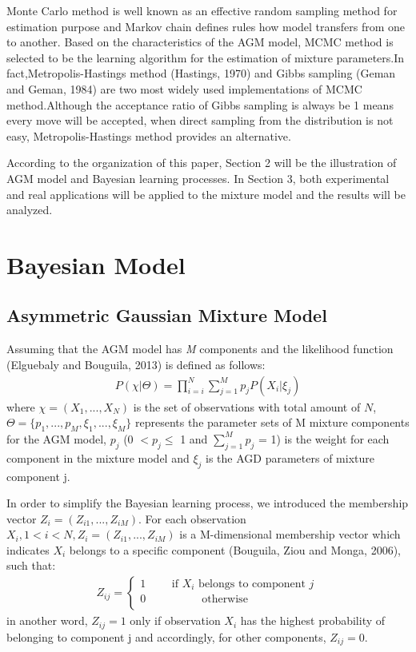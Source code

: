 \documentclass[conference]{llncs}
\begin{document}
Monte Carlo method is well known as an effective random sampling method for estimation purpose and Markov chain defines rules how model transfers from one to another. Based on the characteristics of the AGM model, MCMC method is selected to be the learning algorithm for the estimation of mixture parameters.In fact,Metropolis-Hastings method (Hastings, 1970)\cite{b4} and Gibbs sampling (Geman and Geman, 1984)\cite{b5} are two most widely used implementations of MCMC method.Although the acceptance ratio of Gibbs sampling is always be 1 means every move will be accepted, when direct sampling from the distribution is not easy, Metropolis-Hastings method provides an alternative.

According to the organization of this paper, Section 2 will be the illustration of AGM model and Bayesian learning processes. In Section 3, both experimental and real applications will be applied to the mixture model and the results will be analyzed.


\section{Bayesian Model}
\subsection{Asymmetric Gaussian Mixture Model}
Assuming that the AGM model has \textsl{M} components and the likelihood function (Elguebaly and Bouguila, 2013)\cite{b1} is defined as follows:
\begin{align}
P(\chi|\Theta) = \prod_{i=i}^N \sum_{j=1}^Mp_jP(X_i|\xi_j)
\label{eq:1}
\end{align}
where $\chi = (X_1,...,X_N)$ is the set of observations with total amount of $N$, $\Theta = \{p_1,...,p_M, \xi_1,...,\xi_M\}$ represents the parameter sets of M mixture components for the AGM model, $p_j$ (0 $< p_j \leq$ 1 and $\sum_{j=1}^Mp_j$ = 1) is the weight for each component in the mixture model and $\xi_j$ is the AGD parameters of mixture component j.

In order to simplify the Bayesian learning process, we introduced the membership vector $Z_i=(Z_{i1},...,Z_{iM})$. For each observation $X_i, 1 < i <N, Z_i = (Z_{i1},...,Z_{iM})$ is a M-dimensional membership vector which indicates $X_i$ belongs to a specific component (Bouguila, Ziou and Monga, 2006)\cite{b6}, such that:
\begin{align}
Z_{ij} = \left\{\begin{matrix}
1\qquad\mbox{ if }X_i\mbox{  belongs to component }j \\
0\qquad\quad\qquad \mbox{otherwise} \qquad\qquad\quad\quad \\
\end{matrix}\right.
\label{eq:2}
\end{align}
in another word, $Z_{ij} = 1$ only if observation $X_i$ has the highest probability of belonging to component j and accordingly, for other components, $Z_{ij} = 0$. 
\end{document}
